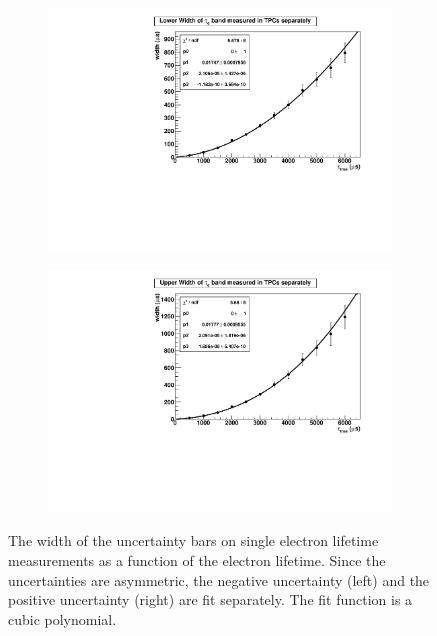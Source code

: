 \documentclass[herrin-thesis.tex]{subfiles}
\begin{document}
\begin{figure}[htd]
\begin{subfigure}[b]{0.5\linewidth}
\centering
\includegraphics[width=1.0\columnwidth]{./plots/el_sim_errm_fit.pdf}
\end{subfigure}%
\begin{subfigure}[b]{0.5\linewidth}
\centering
\includegraphics[width=1.0\columnwidth]{./plots/el_sim_errp_fit.pdf}
\end{subfigure}
\caption[Fits to errors on electron lifetime measurements]{The width of the uncertainty bars on single electron lifetime measurements as a function of the electron lifetime. Since the uncertainties  are asymmetric, the negative uncertainty (left) and the positive uncertainty (right) are fit separately. The fit function is a cubic polynomial.}
\label{fig:el_err_fits}
\end{figure}
\end{document}
